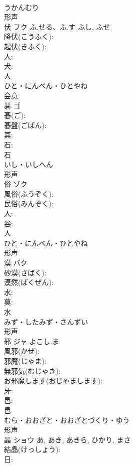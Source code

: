 \documentclass[8pt]{extreport}
\begin{document}
\begin{CJK}{UTF8}{min}
\\	うかんむり	
\\	形声 
\\	伏	フク	ふ.せる、ふ.す	ふし, ふせ	
\\	降伏(こうふく): 
\\	起伏(きふく): 
\\	人: 
\\	犬: 
\\	人	
\\	ひと・にんべん・ひとやね	
\\	会意 
\\	碁	ゴ			
\\	碁(ご): 
\\	碁盤(ごばん): 
\\	其: 
\\	石: 
\\	石	
\\	いし・いしへん	
\\	形声 
\\	俗	ゾク			
\\	風俗(ふうぞく): 
\\	民俗(みんぞく): 
\\	人: 
\\	谷: 
\\	人	
\\	ひと・にんべん・ひとやね	
\\	形声 
\\	漠	バク			
\\	砂漠(さばく): 
\\	漠然(ばくぜん): 
\\	水: 
\\	莫: 
\\	水	
\\	みず・したみず・さんずい	
\\	形声 
\\	邪	ジャ	よこし.ま		
\\	風邪(かぜ): 
\\	邪魔(じゃま): 
\\	無邪気(むじゃき): 
\\	お邪魔します(おじゃまします): 
\\	牙: 
\\	邑: 
\\	邑	
\\	むら・おおざと・おおざとづくり・ゆう	
\\	形声 
\\	晶	ショウ		あ, あき, あきら, ひかり, まさ	
\\	結晶(けっしょう): 
\\	日: 

\end{CJK}
\end{document}
